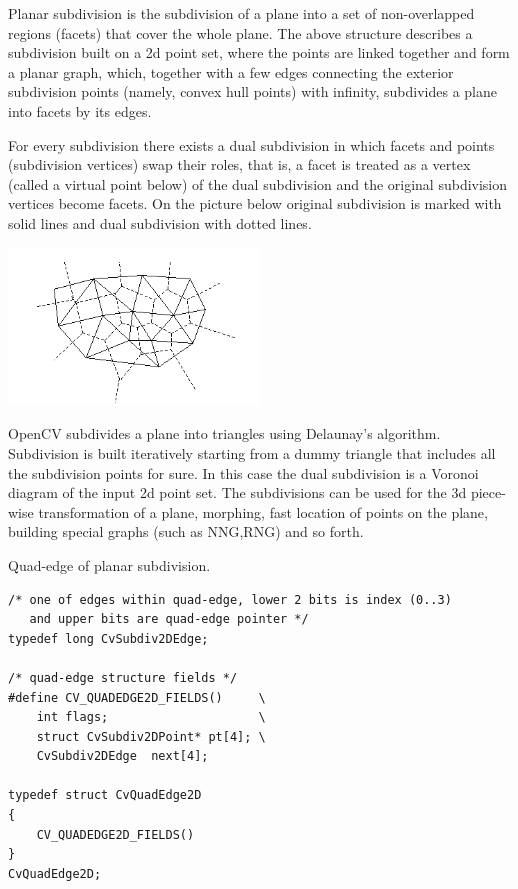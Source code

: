 Planar subdivision is the subdivision of a plane into a set of
non-overlapped regions (facets) that cover the whole plane. The above
structure describes a subdivision built on a 2d point set, where the points
are linked together and form a planar graph, which, together with a few
edges connecting the exterior subdivision points (namely, convex hull points)
with infinity, subdivides a plane into facets by its edges.

For every subdivision there exists a dual subdivision in which facets and
points (subdivision vertices) swap their roles, that is, a facet is
treated as a vertex (called a virtual point below) of the dual subdivision and
the original subdivision vertices become facets. On the picture below
original subdivision is marked with solid lines and dual subdivision
with dotted lines.

\includegraphics[width=0.5\textwidth]{pics/subdiv.png}

OpenCV subdivides a plane into triangles using Delaunay's
algorithm. Subdivision is built iteratively starting from a dummy
triangle that includes all the subdivision points for sure. In this
case the dual subdivision is a Voronoi diagram of the input 2d point set. The
subdivisions can be used for the 3d piece-wise transformation of a plane,
morphing, fast location of points on the plane, building special graphs
(such as NNG,RNG) and so forth.

\label{CvQuadEdge2D}

Quad-edge of planar subdivision.

\begin{lstlisting}
/* one of edges within quad-edge, lower 2 bits is index (0..3)
   and upper bits are quad-edge pointer */
typedef long CvSubdiv2DEdge;

/* quad-edge structure fields */
#define CV_QUADEDGE2D_FIELDS()     \
    int flags;                     \
    struct CvSubdiv2DPoint* pt[4]; \
    CvSubdiv2DEdge  next[4];

typedef struct CvQuadEdge2D
{
    CV_QUADEDGE2D_FIELDS()
}
CvQuadEdge2D;

\end{lstlisting}

